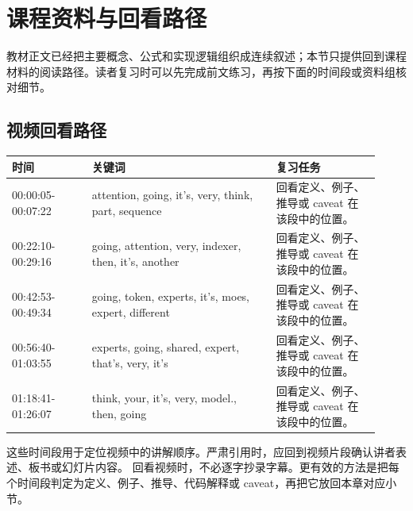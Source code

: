 \documentclass[a4paper]{article}
\begin{document}
\section{课程资料与回看路径}
教材正文已经把主要概念、公式和实现逻辑组织成连续叙述；本节只提供回到课程材料的阅读路径。读者复习时可以先完成前文练习，再按下面的时间段或资料组核对细节。
\subsection{视频回看路径}
\begin{longtable}{p{0.20\linewidth}p{0.46\linewidth}p{0.26\linewidth}}
\toprule
\textbf{时间} & \textbf{关键词} & \textbf{复习任务}\\
\midrule
00:00:05-00:07:22 & attention, going, it's, very, think, part, sequence & 回看定义、例子、推导或 caveat 在该段中的位置。\\
00:22:10-00:29:16 & going, attention, very, indexer, then, it's, another & 回看定义、例子、推导或 caveat 在该段中的位置。\\
00:42:53-00:49:34 & going, token, experts, it's, moes, expert, different & 回看定义、例子、推导或 caveat 在该段中的位置。\\
00:56:40-01:03:55 & experts, going, shared, expert, that's, very, it's & 回看定义、例子、推导或 caveat 在该段中的位置。\\
01:18:41-01:26:07 & think, your, it's, very, model., then, going & 回看定义、例子、推导或 caveat 在该段中的位置。\\
\bottomrule
\end{longtable}
这些时间段用于定位视频中的讲解顺序。严肃引用时，应回到视频片段确认讲者表述、板书或幻灯片内容。
回看视频时，不必逐字抄录字幕。更有效的方法是把每个时间段判定为定义、例子、推导、代码解释或 caveat，再把它放回本章对应小节。
\end{document}
